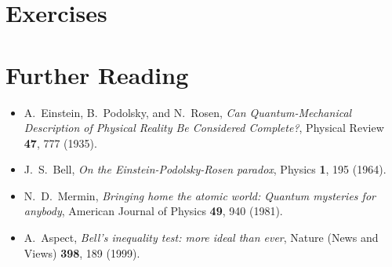 \documentclass[pra,11pt]{revtex4}
\begin{document}
\section{Exercises}



\section{Further Reading}

\begin{itemize}
\item A.~Einstein, B.~Podolsky, and N.~Rosen,
  \textit{Can Quantum-Mechanical Description of Physical Reality Be
    Considered Complete?}, Physical Review \textbf{47}, 777 (1935).

\item J.~S.~Bell, \textit{On the Einstein-Podolsky-Rosen paradox},
  Physics \textbf{1}, 195 (1964).
  
\item N.~D.~Mermin, \textit{Bringing home the atomic world: Quantum
  mysteries for anybody}, American Journal of Physics \textbf{49}, 940
  (1981).

\item A.~Aspect, \textit{Bell's inequality test: more ideal than ever},
  Nature (News and Views) \textbf{398}, 189 (1999).
\end{itemize}
\end{document}
